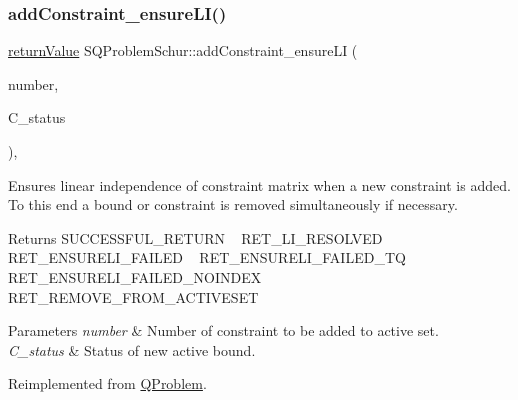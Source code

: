 \subsubsection{\texorpdfstring{add\+Constraint\+\_\+ensure\+L\+I()}{addConstraint\_ensureLI()}}
{\footnotesize\ttfamily \hyperlink{_message_handling_8hpp_a81d556f613bfbabd0b1f9488c0fa865e}{return\+Value} S\+Q\+Problem\+Schur\+::add\+Constraint\+\_\+ensure\+LI (\begin{DoxyParamCaption}\item[{\hyperlink{_types_8hpp_ab6fd6105e64ed14a0c9281326f05e623}{int\+\_\+t}}]{number,  }\item[{\hyperlink{_types_8hpp_a70a6a40d261a015ead8d43aa589383a4}{Subject\+To\+Status}}]{C\+\_\+status }\end{DoxyParamCaption})\hspace{0.3cm}{\ttfamily [protected]}, {\ttfamily [virtual]}}

Ensures linear independence of constraint matrix when a new constraint is added. To this end a bound or constraint is removed simultaneously if necessary. \begin{DoxyReturn}{Returns}
S\+U\+C\+C\+E\+S\+S\+F\+U\+L\+\_\+\+R\+E\+T\+U\+RN ~\newline
 R\+E\+T\+\_\+\+L\+I\+\_\+\+R\+E\+S\+O\+L\+V\+ED ~\newline
 R\+E\+T\+\_\+\+E\+N\+S\+U\+R\+E\+L\+I\+\_\+\+F\+A\+I\+L\+ED ~\newline
 R\+E\+T\+\_\+\+E\+N\+S\+U\+R\+E\+L\+I\+\_\+\+F\+A\+I\+L\+E\+D\+\_\+\+TQ ~\newline
 R\+E\+T\+\_\+\+E\+N\+S\+U\+R\+E\+L\+I\+\_\+\+F\+A\+I\+L\+E\+D\+\_\+\+N\+O\+I\+N\+D\+EX ~\newline
 R\+E\+T\+\_\+\+R\+E\+M\+O\+V\+E\+\_\+\+F\+R\+O\+M\+\_\+\+A\+C\+T\+I\+V\+E\+S\+ET 
\end{DoxyReturn}

\begin{DoxyParams}{Parameters}
{\em number} & Number of constraint to be added to active set. \\
\hline
{\em C\+\_\+status} & Status of new active bound. \\
\hline
\end{DoxyParams}


Reimplemented from \hyperlink{class_q_problem_a5761ba3214ade56f7857468e746a6469}{Q\+Problem}.

\mbox{\label{class_s_q_problem_schur_a63c65484b647bf456d41b3d9becb1e38}} 
